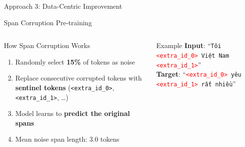 \documentclass[10pt, aspectratio=169]{beamer}
\begin{document}
\begin{frame}[shrink=12]{Approach 3: Data-Centric Improvement}
  \vspace{0.3cm}
  \begin{center}
  \end{center}
\end{frame}

\begin{frame}[shrink=8]{Span Corruption Pre-training}
  \begin{columns}[T]
    \begin{block}{How Span Corruption Works}
      \begin{enumerate}
        \item Randomly select \textbf{15\%} of tokens as noise
        \item Replace consecutive corrupted tokens with \textbf{sentinel tokens} (\texttt{<extra\_id\_0>}, \texttt{<extra\_id\_1>}, \ldots)
        \item Model learns to \textbf{predict the original spans}
        \item Mean noise span length: 3.0 tokens
      \end{enumerate}
    \end{block}
    \vspace{0.2cm}
    \begin{exampleblock}{Example}
      \textbf{Input}: ``\texttt{Tôi \textcolor{red}{<extra\_id\_0>} Việt Nam \textcolor{red}{<extra\_id\_1>}}''\\[3pt]
      \textbf{Target}: ``\texttt{\textcolor{red}{<extra\_id\_0>} yêu \textcolor{red}{<extra\_id\_1>} rất nhiều}''
    \end{exampleblock}


\end{columns}
\end{frame}
\end{document}
